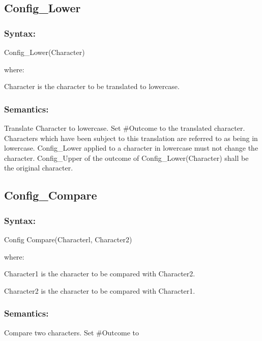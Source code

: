 \subsection{Config\_Lower}\label{config_lower}

\subsubsection{Syntax:}\label{syntax-3}

Config\_Lower(Character)

where:

Character is the character to be translated to lowercase.

\subsubsection{Semantics:}\label{semantics-4}

Translate Character to lowercase. Set \#Outcome to the translated
character. Characters which have been subject to this translation are
referred to as being in lowercase. Config\_Lower applied to a character
in lowercase must not change the character. Config\_Upper of the outcome
of Config\_Lower(Character) shall be the original character.

\subsection{Config\_Compare}\label{config_compare}

\subsubsection{Syntax:}\label{syntax-4}

Config Compare(Characterl, Character2)

where:

Character1 is the character to be compared with Character2.

Character2 is the character to be compared with Character1.

\subsubsection{Semantics:}\label{semantics-5}

Compare two characters. Set \#Outcome to


